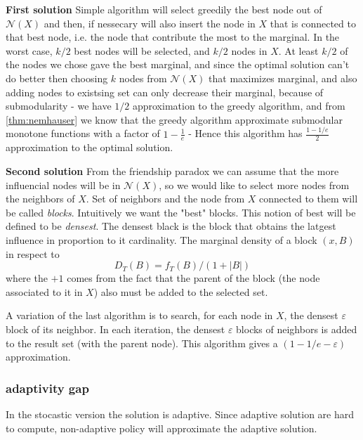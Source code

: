 \textbf{First solution}
Simple algorithm will select greedily the best node out of $\mathcal{N}(X)$ and then, if nessecary will also insert
 the node in $X$ that is connected to that best node, i.e. the node that contribute the most to the marginal. In the worst case, $k/2$ best nodes will be selected, and $k/2$ nodes in $X$. 
At least $k/2$ of the nodes we chose gave the best marginal, and since the optimal solution can't do better then choosing $k$ nodes from $\mathcal{N}(X)$ that maximizes marginal, and also adding nodes to existsing set can only decrease their marginal, because of submodularity - we have $1/2$ approximation to the greedy algorithm, and from \ref{thm:nemhauser} we know that the greedy algorithm approximate submodular monotone functions with a factor of $1-\frac{1}{e}$ - Hence this algorithm has $\frac{1-1/e}{2}$ approximation to the optimal solution.

\textbf{Second solution}
From the friendship paradox we can assume that the more influencial nodes will be in $\mathcal{N}(X)$, so we would like to select more nodes from the neighbors of $X$. Set of neighbors and the node from $X$ connected to them will be called \textit{blocks}. Intuitively we want the "best" blocks. This notion of best will be defined to be \textit{densest}. The densest black is the block that obtains the latgest influence in proportion to it cardinality. The marginal density of a block $(x,B)$ in respect to 
$$D_T(B)=f_T(B)/(1+|B|)$$ where the $+1$ comes from the fact that the parent of the block (the node associated to it in $X$) also must be added to the selected set.

 A variation of the last algorithm is to search, for each node in $X$, the densest $\varepsilon$ block of its neighbor. In each iteration, the densest $\varepsilon$ blocks of neighbors is added to the result set (with the parent node). This algorithm gives a $(1-1/e-\varepsilon)$ approximation.


\subsubsection{adaptivity gap}
In the stocastic version the solution is adaptive. Since adaptive solution are hard to compute, non-adaptive policy will approximate the adaptive solution.
 
